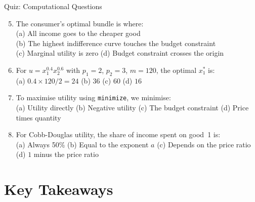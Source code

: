 \documentclass[aspectratio=169, 10pt]{beamer}
\begin{document}
\begin{frame}{Quiz: Computational Questions}
\begin{enumerate}\setcounter{enumi}{4}
  \item The consumer's optimal bundle is where:\\
        (a) All income goes to the cheaper good\\
        (b) \alert{The highest indifference curve touches the budget constraint}\\
        (c) Marginal utility is zero \quad
        (d) Budget constraint crosses the origin
  \vspace{0.3em}
  \item For $u = x_1^{0.4}x_2^{0.6}$ with $p_1=2$, $p_2=3$, $m=120$,
        the optimal $x_1^*$ is:\\
        (a) \alert{$0.4 \times 120/2 = 24$} \quad (b) $36$ \quad
        (c) $60$ \quad (d) $16$
  \vspace{0.3em}
  \item To maximise utility using \texttt{minimize}, we minimise:\\
        (a) Utility directly \quad (b) \alert{Negative utility} \quad
        (c) The budget constraint \quad (d) Price times quantity
  \vspace{0.3em}
  \item For Cobb-Douglas utility, the share of income spent on good~1 is:\\
        (a) Always 50\% \quad (b) \alert{Equal to the exponent $a$} \quad
        (c) Depends on the price ratio \quad (d) $1$ minus the price ratio
\end{enumerate}
\end{frame}

\section{Key Takeaways}
\end{document}
